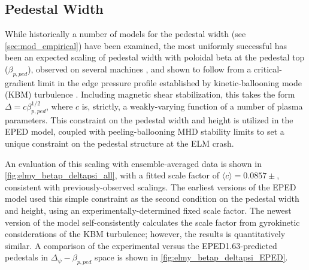 \subsection{Pedestal Width}\label{subsec:elmy_eped_width}

While historically a number of models for the pedestal width (see \cref{sec:mod_empirical}) have been examined, the most uniformly successful has been an expected scaling of pedestal width with poloidal beta at the pedestal top ($\beta_{p,ped}$), observed on several machines , and shown to follow from a critical-gradient limit in the edge pressure profile established by kinetic-ballooning mode (KBM) turbulence .  Including magnetic shear stabilization, this takes the form $\Delta = c \beta_{p,ped}^{1/2}$, where $c$ is, strictly, a weakly-varying function of a number of plasma parameters.  This constraint on the pedestal width and height is utilized in the EPED model, coupled with peeling-ballooning MHD stability limits to set a unique constraint on the pedestal structure at the ELM crash.

An evaluation of this scaling with ensemble-averaged data is shown in \cref{fig:elmy_betap_deltapsi_all}, with a fitted scale factor of $\langle c \rangle = 0.0857 \pm$, consistent with previously-observed scalings.  The earliest versions of the EPED model used this simple constraint as the second condition on the pedestal width and height, using an experimentally-determined fixed scale factor.  The newest version of the model self-consistently calculates the scale factor from gyrokinetic considerations of the KBM turbulence; however, the results is quantitatively similar.  A comparison of the experimental versus the EPED1.63-predicted pedestals in $\Delta_\psi - \beta_{p,ped}$ space is shown in \cref{fig:elmy_betap_deltapsi_EPED}.

\begin{figure}[ht]
 \pushtooutside
\end{figure}


